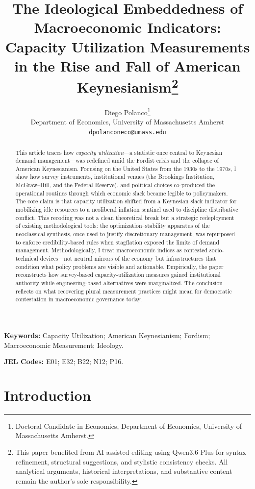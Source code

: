 \documentclass[11pt]{article}
\title{The Ideological Embeddedness of Macroeconomic Indicators: \\
Capacity Utilization Measurements in the Rise and Fall of American Keynesianism\thanks{This paper benefited from AI-assisted editing using Qwen3.6 Plus for syntax refinement, structural suggestions, and stylistic consistency checks. All analytical arguments, historical interpretations, and substantive content remain the author's sole responsibility.}}
\author{Diego Polanco\thanks{Doctoral Candidate in Economics, Department of Economics, University of Massachusetts Amherst.}\\
Department of Economics, University of Massachusetts Amherst\\
\texttt{dpolanconeco@umass.edu}}
\begin{document}
\maketitle

\begin{abstract}
This article traces how \textit{capacity utilization}---a statistic once central to Keynesian demand management---was redefined amid the Fordist crisis and the collapse of American Keynesianism. Focusing on the United States from the 1930s to the 1970s, I show how survey instruments, institutional venues (the Brookings Institution, McGraw--Hill, and the Federal Reserve), and political choices co-produced the operational routines through which economic slack became legible to policymakers. The core claim is that capacity utilization shifted from a Keynesian slack indicator for mobilizing idle resources to a neoliberal inflation sentinel used to discipline distributive conflict. This recoding was not a clean theoretical break but a strategic redeployment of existing methodological tools: the optimization--stability apparatus of the neoclassical synthesis, once used to justify discretionary management, was repurposed to enforce credibility-based rules when stagflation exposed the limits of demand management. Methodologically, I treat macroeconomic indices as contested socio-technical devices---not neutral mirrors of the economy but infrastructures that condition what policy problems are visible and actionable. Empirically, the paper reconstructs how survey-based capacity-utilization measures gained institutional authority while engineering-based alternatives were marginalized. The conclusion reflects on what recovering plural measurement practices might mean for democratic contestation in macroeconomic governance today.
\end{abstract}

\vspace{1cm}

\noindent\textbf{Keywords:} Capacity Utilization; American Keynesianism; Fordism; Macroeconomic Measurement; Ideology.

\noindent\textbf{JEL Codes:} E01; E32; B22; N12; P16.

\pagebreak

\section{Introduction}
\end{document}
